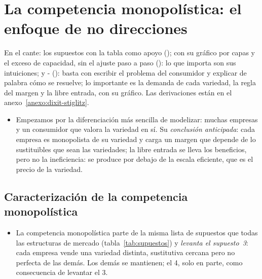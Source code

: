 \documentclass[11pt]{article}
\begin{document}
\section{La competencia monopolística:\cortetitulo{} el enfoque de no direcciones}\label{sec:competencia-monopolistica}

\begin{notaopositor}
En el cante: los supuestos con la tabla como apoyo ();  con su gráfico por capas y el exceso de capacidad, sin el ajuste paso a paso (): lo que importa son sus intuiciones; y - (): basta con escribir el problema del consumidor y explicar de palabra cómo se resuelve; lo importante es la demanda de cada variedad, la regla del margen y la libre entrada, con su gráfico. Las derivaciones están en el anexo~\ref{anexo:dixit-stiglitz}.
\end{notaopositor}

\begin{itemize}
\item Empezamos por la diferenciación más sencilla de modelizar: muchas empresas y un consumidor que valora la variedad en sí. Su \emph{conclusión anticipada}: cada empresa es monopolista de su variedad y carga un margen que depende de lo sustituibles que sean las variedades; la libre entrada se lleva los beneficios, pero no la ineficiencia: se produce por debajo de la escala eficiente, que es el precio de la variedad.
\end{itemize}

\subsection{Caracterización de la competencia monopolística}\label{sec:caracterizacion-cm}

\begin{itemize}
\item La competencia monopolística parte de la misma lista de supuestos que todas las estructuras de mercado (tabla~\ref{tab:supuestos})  y \emph{levanta el supuesto~3}: cada empresa vende una variedad distinta, sustitutiva cercana pero no perfecta de las demás. Los demás se mantienen; el 4, solo en parte, como consecuencia de levantar el 3.
\end{itemize}
\end{document}
